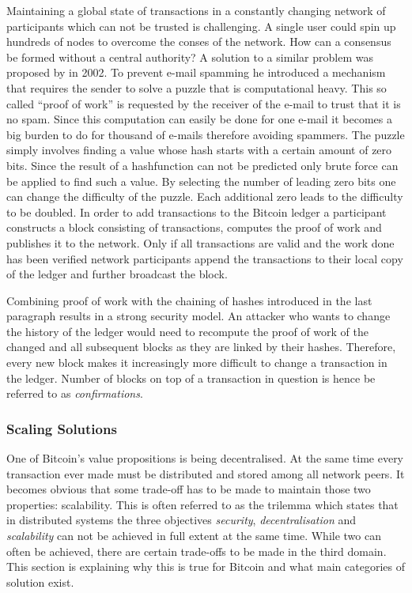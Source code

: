 \documentclass[final]{fhnwreport}       %
\begin{document}
Maintaining a global state of transactions in a constantly changing network of participants which can not be trusted is challenging. A single user could spin up hundreds of nodes to overcome the conses of the network. How can a consensus be formed without a central authority? A solution to a similar problem was proposed by \textcite{back_hashcash_2002} in 2002. To prevent e-mail spamming he introduced a mechanism that requires the sender to solve a puzzle that is computational heavy. This so called ``proof of work'' is requested by the receiver of the e-mail to trust that it is no spam. Since this computation can easily be done for one e-mail it becomes a big burden to do for thousand of e-mails therefore avoiding spammers. The puzzle simply involves finding a value whose \gls{hash} starts with a certain amount of zero bits. Since the result of a \gls{hashfunction} can not be predicted only brute force can be applied to find such a value. By selecting the number of leading zero bits one can change the difficulty of the puzzle. Each additional zero leads to the difficulty to be doubled. In order to add transactions to the Bitcoin ledger a participant constructs a block consisting of transactions, computes the proof of work and publishes it to the network. Only if all transactions are valid and the work done has been verified network participants append the transactions to their local copy of the ledger and further broadcast the block.  

Combining proof of work with the chaining of hashes introduced in the last paragraph results in a strong security model. An attacker who wants to change the history of the ledger would need to recompute the proof of work of the changed and all subsequent blocks as they are linked by their hashes. Therefore, every new block makes it increasingly more difficult to change a transaction in the ledger. Number of blocks on top of a transaction in question is hence be referred to as \emph{confirmations}.  

\subsubsection{Scaling Solutions}
One of Bitcoin's value propositions is being decentralised. At the same time every transaction ever made must be distributed and stored among all network peers. It becomes obvious that some trade-off has to be made to maintain those two properties: scalability. This is often referred to as the \gls{trilemma} which states that in distributed systems the three objectives \emph{security}, \emph{decentralisation} and \emph{scalability} can not be achieved in full extent at the same time. While two can often be achieved, there are certain trade-offs to be made in the third domain. This section is explaining why this is true for Bitcoin and what main categories of solution exist.
\end{document}
